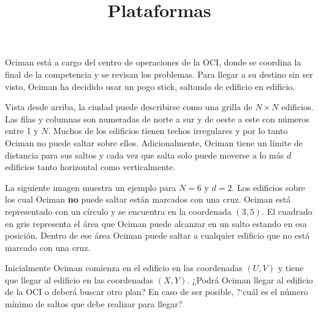\documentclass{oci}
\title{Plataformas}
\begin{document}
\begin{problemDescription}
Ociman está a cargo del centro de operaciones de la OCI, donde se coordina la
final de la competencia y se revisan los problemas.
Para llegar a su destino sin ser visto, Ociman ha decidido usar un pogo stick,
saltando de edificio en edificio.

Vista desde arriba, la ciudad puede describirse como una grilla de $N\times N$
edificios.
Las filas y columnas son numeradas de norte a sur y de oeste a este con números
entre 1 y $N$.
Muchos de los edificios tienen techos irregulares y por lo tanto Ociman no
puede saltar sobre ellos.
Adicionalmente, Ociman tiene un límite de distancia para sus saltos y cada vez
que salta solo puede moverse a lo más $d$ edificios tanto horizontal como
verticalmente.

La siguiente imagen muestra un ejemplo para $N=6$ y $d=2$.
Los edificios sobre los cual Ociman \textbf{no} puede saltar están marcados con
una cruz.
Ociman está representado con un círculo y se encuentra en la coordenada $(3, 5)$.
El cuadrado en gris representa el área que Ociman puede alcanzar en un salto
estando en esa posición.
Dentro de ese área Ociman puede saltar a cualquier edificio que no está marcado
con una cruz.

\begin{center}
\end{center}

Inicialmente Ociman comienza en el edificio en las coordenadas $(U, V)$ y tiene
que llegar al edificio en las coordenadas $(X, Y)$.
¿Podrá Ociman llegar al edificio de la OCI o deberá buscar otro plan?
En caso de ser posible, ?`cuál es el número mínimo de saltos que debe realizar
para llegar? 
\end{problemDescription}
\end{document}
